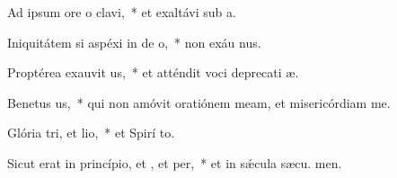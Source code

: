 \item Ad ipsum ore o clavi,~* et exaltávi sub  a.
\item Iniquitátem si aspéxi in de o,~* non exáu nus.
\item Proptérea exauvit us,~* et atténdit voci deprecati æ.
\item Benetus us,~* qui non amóvit oratiónem meam, et misericórdiam   me.
\item Glória tri, et lio,~* et Spirí to.
\item Sicut erat in princípio, et , et per,~* et in sǽcula sæcu. men.
